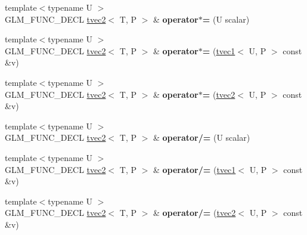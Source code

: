 \begin{DoxyCompactItemize}
\item 
\hypertarget{structglm_1_1tvec2_a9f36256877446354bbc7d6a3dbcb5c36}{{\footnotesize template$<$typename U $>$ }\\G\-L\-M\-\_\-\-F\-U\-N\-C\-\_\-\-D\-E\-C\-L \hyperlink{structglm_1_1tvec2}{tvec2}$<$ T, P $>$ \& {\bfseries operator$\ast$=} (U scalar)}\label{structglm_1_1tvec2_a9f36256877446354bbc7d6a3dbcb5c36}

\item 
\hypertarget{structglm_1_1tvec2_a750b6e459213cd75ca333054f188779f}{{\footnotesize template$<$typename U $>$ }\\G\-L\-M\-\_\-\-F\-U\-N\-C\-\_\-\-D\-E\-C\-L \hyperlink{structglm_1_1tvec2}{tvec2}$<$ T, P $>$ \& {\bfseries operator$\ast$=} (\hyperlink{structglm_1_1tvec1}{tvec1}$<$ U, P $>$ const \&v)}\label{structglm_1_1tvec2_a750b6e459213cd75ca333054f188779f}

\item 
\hypertarget{structglm_1_1tvec2_aa9e3fea6b7122af79c1fa65fc66c1170}{{\footnotesize template$<$typename U $>$ }\\G\-L\-M\-\_\-\-F\-U\-N\-C\-\_\-\-D\-E\-C\-L \hyperlink{structglm_1_1tvec2}{tvec2}$<$ T, P $>$ \& {\bfseries operator$\ast$=} (\hyperlink{structglm_1_1tvec2}{tvec2}$<$ U, P $>$ const \&v)}\label{structglm_1_1tvec2_aa9e3fea6b7122af79c1fa65fc66c1170}

\item 
\hypertarget{structglm_1_1tvec2_ae917fca6ea5283f763f1887f778a6ded}{{\footnotesize template$<$typename U $>$ }\\G\-L\-M\-\_\-\-F\-U\-N\-C\-\_\-\-D\-E\-C\-L \hyperlink{structglm_1_1tvec2}{tvec2}$<$ T, P $>$ \& {\bfseries operator/=} (U scalar)}\label{structglm_1_1tvec2_ae917fca6ea5283f763f1887f778a6ded}

\item 
\hypertarget{structglm_1_1tvec2_a4e8369479212934e679d59357f82db7b}{{\footnotesize template$<$typename U $>$ }\\G\-L\-M\-\_\-\-F\-U\-N\-C\-\_\-\-D\-E\-C\-L \hyperlink{structglm_1_1tvec2}{tvec2}$<$ T, P $>$ \& {\bfseries operator/=} (\hyperlink{structglm_1_1tvec1}{tvec1}$<$ U, P $>$ const \&v)}\label{structglm_1_1tvec2_a4e8369479212934e679d59357f82db7b}

\item 
\hypertarget{structglm_1_1tvec2_a42e14ad86fc32cc36ba3a512cd638585}{{\footnotesize template$<$typename U $>$ }\\G\-L\-M\-\_\-\-F\-U\-N\-C\-\_\-\-D\-E\-C\-L \hyperlink{structglm_1_1tvec2}{tvec2}$<$ T, P $>$ \& {\bfseries operator/=} (\hyperlink{structglm_1_1tvec2}{tvec2}$<$ U, P $>$ const \&v)}\label{structglm_1_1tvec2_a42e14ad86fc32cc36ba3a512cd638585}


\end{DoxyCompactItemize}
